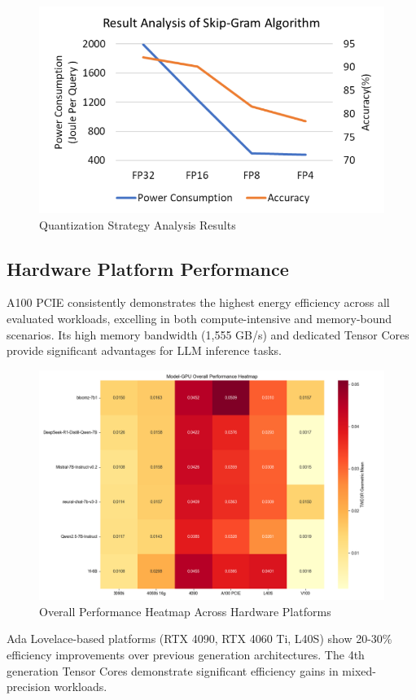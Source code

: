 \documentclass[sigconf,review]{acmart}
\begin{document}
\begin{figure}[h]
\centering
\includegraphics[width=0.8\columnwidth]{../final_pr/latex-pr/img/Result_Analysis_Algorithm.png}
\caption{Quantization Strategy Analysis Results}
\label{fig:task_complexity}
\end{figure}

\subsection{Hardware Platform Performance}

A100 PCIE consistently demonstrates the highest energy efficiency across all evaluated workloads, excelling in both compute-intensive and memory-bound scenarios. Its high memory bandwidth (1,555 GB/s) and dedicated Tensor Cores provide significant advantages for LLM inference tasks.

\begin{figure}[h]
\centering
\includegraphics[width=0.8\columnwidth]{../final_report/img/overall_performance_heatmap.png}
\caption{Overall Performance Heatmap Across Hardware Platforms}
\label{fig:performance_heatmap}
\end{figure}

Ada Lovelace-based platforms (RTX 4090, RTX 4060 Ti, L40S) show 20-30\% efficiency improvements over previous generation architectures. The 4th generation Tensor Cores demonstrate significant efficiency gains in mixed-precision workloads.
\end{document}
